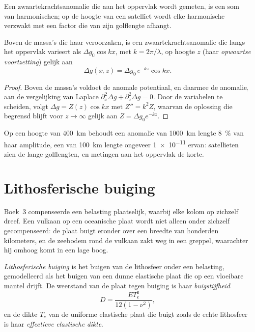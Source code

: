 Een zwaartekrachtsanomalie die aan het oppervlak wordt gemeten, is een som van harmonischen; op
de hoogte van een satelliet wordt elke harmonische verzwakt met een factor die van
zijn golflengte afhangt.

\begin{proposition}\label{prop:b3:gravity-geodesy:upward}
Boven de massa's die haar veroorzaken, is een zwaartekrachtsanomalie die langs het oppervlak
varieert als $\Delta g_0\cos kx$, met $k = 2\pi/\lambda$, op hoogte $z$ (haar
\emph{opwaartse voortzetting}) gelijk aan
\[
  \Delta g(x, z) = \Delta g_0\,e^{-kz}\cos kx .
\]
\end{proposition}

\begin{proof}
Boven de massa's voldoet de anomale potentiaal, en daarmee de anomalie, aan
de vergelijking van Laplace $\partial_x^2\Delta g + \partial_z^2\Delta g = 0$. Door de
variabelen te scheiden, volgt $\Delta g = Z(z)\cos kx$ met $Z'' = k^2Z$, waarvan de oplossing die begrensd blijft voor
$z \to \infty$ gelijk aan $Z = \Delta g_0e^{-kz}$.
\end{proof}

Op een hoogte van \qty{400}{km} behoudt een anomalie van \qty{1000}{km} lengte \qty{8}{\percent}
van haar amplitude, een van \qty{100}{km} lengte ongeveer \num{1e-11} ervan:
satellieten zien de lange golflengten, en metingen aan het oppervlak de korte.

\section{Lithosferische buiging}

Boek~3 compenseerde een belasting plaatselijk, waarbij elke kolom op zichzelf dreef.
Een vulkaan op een oceanische plaat wordt niet alleen onder zichzelf gecompenseerd: de
plaat buigt eronder over een breedte van honderden kilometers, en de zeebodem
rond de vulkaan zakt weg in een greppel, waarachter hij omhoog komt in een lage boog.

\begin{definition}\label{def:b3:gravity-geodesy:flexure}
\emph{Lithosferische buiging} is het buigen van de
lithosfeer onder een belasting, gemodelleerd als het buigen van een dunne elastische plaat
die op een vloeibare mantel drijft. De weerstand van de plaat tegen buiging is haar
\emph{buigstijfheid}
\[
  D = \frac{ET_e^3}{12(1 - \nu^2)},
\]
en de dikte $T_e$ van de uniforme elastische plaat die buigt zoals de echte
lithosfeer is haar \emph{effectieve elastische dikte}.
\end{definition}

